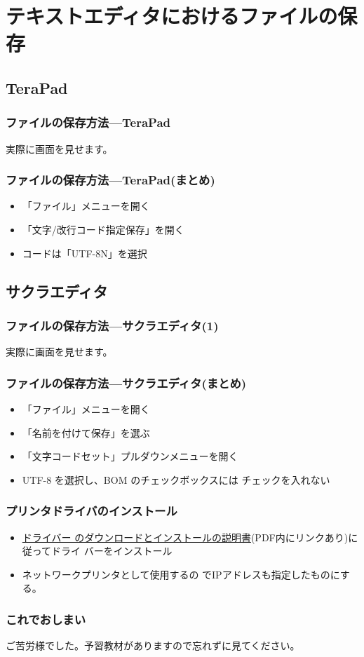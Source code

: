 \section[ファイルの保存]{テキストエディタにおけるファイルの保存}
\subsection{TeraPad}
\begin{frame}[containsverbatim]
 \frametitle{ファイルの保存方法---TeraPad}
 実際に画面を見せます。
\end{frame}
\begin{frame}[containsverbatim]
 \frametitle{ファイルの保存方法---TeraPad(まとめ)}
\begin{itemize}
 \item 「ファイル」メニューを開く
 \item 「文字/改行コード指定保存」を開く
 \item コードは「UTF-8N」を選択
\end{itemize}
 
\end{frame}
\subsection{サクラエディタ}
\begin{frame}[containsverbatim]
 \frametitle{ファイルの保存方法---サクラエディタ(1)}
 実際に画面を見せます。
\end{frame}
\begin{frame}[containsverbatim]
 \frametitle{ファイルの保存方法---サクラエディタ(まとめ)}
\begin{itemize}
 \item 「ファイル」メニューを開く
 \item 「名前を付けて保存」を選ぶ
 \item 「文字コードセット」プルダウンメニューを開く
 \item UTF-8 を選択し、BOM のチェックボックスには{\color{red} チェックを入れない}
\end{itemize}
\end{frame}
\begin{frame}
 \frametitle{プリンタドライバのインストール}
\begin{itemize}
 \item \href{http://www.hilano.org/hilano-lab/svg/driverDownload.pdf}{ドライバー
 のダウンロードとインストールの説明書}(PDF内にリンクあり)に従ってドライ
 バーをインストール
 \item ネットワークプリンタとして使用するの
 でIPアドレスも指定したものにする。
\end{itemize}
\end{frame}
\begin{frame}[containsverbatim]
 \frametitle{これでおしまい}
 ご苦労様でした。予習教材がありますので忘れずに見てください。
\end{frame}

\begin{frame}[containsverbatim]
\frametitle{}
\end{frame}

